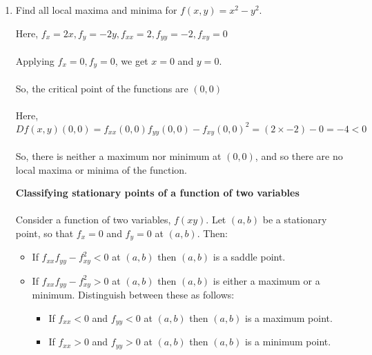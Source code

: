 \begin{enumerate}
\begin{answer}
\end{answer}
\item  Find all local maxima and minima for $f(x, y)=x^{2}-y^{2}$.
\begin{answer}
Here, $f_{x}=2 x, f_{y}=-2 y, f_{x x}=2, f_{y y}=-2, f_{x y}=0$\\\\
Applying $f_{x}=0, f_{y}=0$, we get $x=0$ and $y=0 .$ \\\\So, the critical point of the functions are $(0,0)$\\\\
Here, ${Df(x,y)}(0,0)=f_{x x}(0,0) f_{y y}(0,0)-f_{x y}(0,0)^{2}=(2 \times-2)-0=-4<0$\\\\
So, there is neither a maximum nor minimum at $(0,0)$, and so there are no local maxima or minima of the function.
\begin{note}
	\textbf{Classifying stationary points of a function of two variables}\\\\
	Consider a function of two variables, $f(x y)$. Let $(a, b)$ be a stationary point, so that $f_{x}=0$ and $f_{y}=0$ at $(a, b)$. Then:
	\begin{itemize}
	\item  If $f_{x x} f_{y y}-f_{x y}^{2}<0$ at $(a, b)$ then $(a, b)$ is a saddle point.\\
	\item  If $f_{x x} f_{y y}-f_{x y}^{2}>0$ at $(a, b)$ then $(a, b)$ is either a maximum or a minimum. Distinguish between these as follows:\\

	\begin{itemize}
			\item  If $f_{x x}<0$ and $f_{y y}<0$ at $(a, b)$ then $(a, b)$ is a maximum point.\\
		\item If $f_{x x}>0$ and $f_{y y}>0$ at $(a, b)$ then $(a, b)$ is a minimum point.\\
	\end{itemize}


\end{itemize}
\end{note}
\end{answer}
\end{enumerate}
